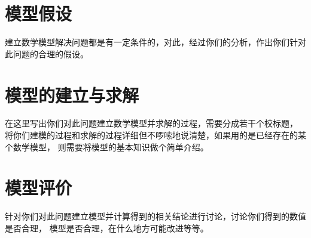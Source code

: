 \documentclass[a4paper, UTF8]{article}
\begin{document}
    \section{模型假设}

        建立数学模型解决问题都是有一定条件的，对此，经过你们的分析，作出你们针对此问题的合理的假设。
	
	\section{模型的建立与求解}
    
        在这里写出你们对此问题建立数学模型并求解的过程，需要分成若干个校标题，
        将你们建模的过程和求解的过程详细但不啰嗦地说清楚，如果用的是已经存在的某个数学模型，
        则需要将模型的基本知识做个简单介绍。

    \section{模型评价}
    
        针对你们对此问题建立模型并计算得到的相关结论进行讨论，讨论你们得到的数值是否合理，
        模型是否合理，在什么地方可能改进等等。
	
\end{document}
